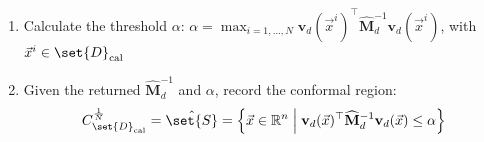 \documentclass[pmlr]{jmlr}%
\begin{document}
\begin{algorithm2e}
\begin{enumerate}
     
     \item Calculate the threshold $\alpha$: $ \alpha =\max _{i=1, \ldots, N} \mathbf{v}_{d}\left(\Vec{x}^{i}\right)^{\top} {\widehat{\mathbf{M}}}^{-1}_d  \mathbf{v}_{d}\left(\Vec{x}^{i}\right)$, with $\Vec{x}^{i}\in \set{D}_\mathrm{cal}$
 \item Given the returned  
 ${\widehat{\mathbf{M}}}^{-1}_d$ and 
 $\alpha$, record 
the conformal region: %
 \[C_{\set{D}_\mathrm{cal}}^{\frac{1}{N}}= \hat{\set{S}}  = \Bigl\{\Vec{x} \in \mathbb{R}^{n} \Bigm| \mathbf{v}_{d}(\Vec{x})^{\top} {\widehat{\mathbf{M}}}^{-1}_d  \mathbf{v}_{d}(\Vec{x}) \leq \alpha  \Bigr\}\]
\end{enumerate}
\end{algorithm2e}
\end{document}
